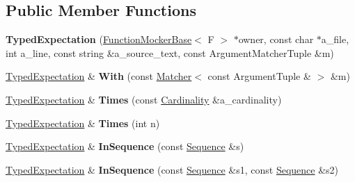 \subsection*{Public Member Functions}
\begin{DoxyCompactItemize}
\item 
{\bfseries Typed\+Expectation} (\hyperlink{classtesting_1_1internal_1_1FunctionMockerBase}{Function\+Mocker\+Base}$<$ F $>$ $\ast$owner, const char $\ast$a\+\_\+file, int a\+\_\+line, const string \&a\+\_\+source\+\_\+text, const Argument\+Matcher\+Tuple \&m)\hypertarget{classtesting_1_1internal_1_1TypedExpectation_a10bd0a8fa0db37215be42e1c61ccbc28}{}\label{classtesting_1_1internal_1_1TypedExpectation_a10bd0a8fa0db37215be42e1c61ccbc28}

\item 
\hyperlink{classtesting_1_1internal_1_1TypedExpectation}{Typed\+Expectation} \& {\bfseries With} (const \hyperlink{classtesting_1_1Matcher}{Matcher}$<$ const Argument\+Tuple \& $>$ \&m)\hypertarget{classtesting_1_1internal_1_1TypedExpectation_a4b25ec3d051e8551f3e213214b31c714}{}\label{classtesting_1_1internal_1_1TypedExpectation_a4b25ec3d051e8551f3e213214b31c714}

\item 
\hyperlink{classtesting_1_1internal_1_1TypedExpectation}{Typed\+Expectation} \& {\bfseries Times} (const \hyperlink{classtesting_1_1Cardinality}{Cardinality} \&a\+\_\+cardinality)\hypertarget{classtesting_1_1internal_1_1TypedExpectation_a9a4c34ee5c6e6adc880a22f61f33da57}{}\label{classtesting_1_1internal_1_1TypedExpectation_a9a4c34ee5c6e6adc880a22f61f33da57}

\item 
\hyperlink{classtesting_1_1internal_1_1TypedExpectation}{Typed\+Expectation} \& {\bfseries Times} (int n)\hypertarget{classtesting_1_1internal_1_1TypedExpectation_a92d56ee785d38ec8193aed2a0fcbccf0}{}\label{classtesting_1_1internal_1_1TypedExpectation_a92d56ee785d38ec8193aed2a0fcbccf0}

\item 
\hyperlink{classtesting_1_1internal_1_1TypedExpectation}{Typed\+Expectation} \& {\bfseries In\+Sequence} (const \hyperlink{classtesting_1_1Sequence}{Sequence} \&s)\hypertarget{classtesting_1_1internal_1_1TypedExpectation_ada9e9081a98435991310ac60483d1230}{}\label{classtesting_1_1internal_1_1TypedExpectation_ada9e9081a98435991310ac60483d1230}

\item 
\hyperlink{classtesting_1_1internal_1_1TypedExpectation}{Typed\+Expectation} \& {\bfseries In\+Sequence} (const \hyperlink{classtesting_1_1Sequence}{Sequence} \&s1, const \hyperlink{classtesting_1_1Sequence}{Sequence} \&s2)\hypertarget{classtesting_1_1internal_1_1TypedExpectation_ac0f45c73e3f816796f6c5dea2dc70131}{}\label{classtesting_1_1internal_1_1TypedExpectation_ac0f45c73e3f816796f6c5dea2dc70131}


\end{DoxyCompactItemize}
